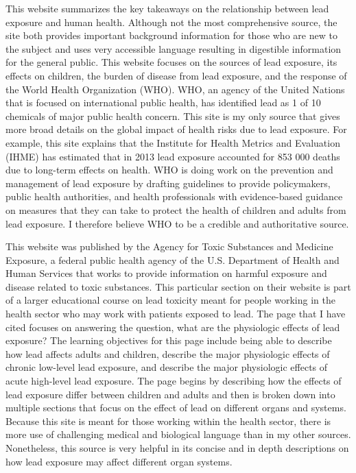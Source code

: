 \documentclass{article}\usepackage[]{graphicx}\usepackage[]{color}
\begin{document}
This website summarizes the key takeaways on the relationship between lead exposure and human health. Although not the most comprehensive source, the site both provides important background information for those who are new to the subject and uses very accessible language resulting in digestible information for the general public. This website focuses on the sources of lead exposure, its effects on children, the burden of disease from lead exposure, and the response of the World Health Organization (WHO). WHO, an agency of the United Nations that is focused on international public health, has identified lead as 1 of 10 chemicals of major public health concern. This site is my only source that gives more broad details on the global impact of health risks due to lead exposure. For example, this site explains that the Institute for Health Metrics and Evaluation (IHME) has estimated that in 2013 lead exposure accounted for 853 000 deaths due to long-term effects on health. WHO is doing work on the prevention and management of lead exposure by drafting guidelines to provide policymakers, public health authorities, and health professionals with evidence-based guidance on measures that they can take to protect the health of children and adults from lead exposure. I therefore believe WHO to be a credible and authoritative source. 



This website was published by the Agency for Toxic Substances and Medicine Exposure, a federal public health agency of the U.S. Department of Health and Human Services that works to provide information on harmful exposure and disease related to toxic substances. This particular section on their website is part of a larger educational course on lead toxicity meant for people working in the health sector who may work with patients exposed to lead. The page that I have cited focuses on answering the question, what are the physiologic effects of lead exposure? The learning objectives for this page include being able to describe how lead affects adults and children, describe the major physiologic effects of chronic low-level lead exposure, and describe the major physiologic effects of acute high-level lead exposure. The page begins by describing how the effects of lead exposure differ between children and adults and then is broken down into multiple sections that focus on the effect of lead on different organs and systems. Because this site is meant for those working within the health sector, there is more use of challenging medical and biological language than in my other sources. Nonetheless, this source is very helpful in its concise and in depth descriptions on how lead exposure may affect different organ systems. 
\end{document}
